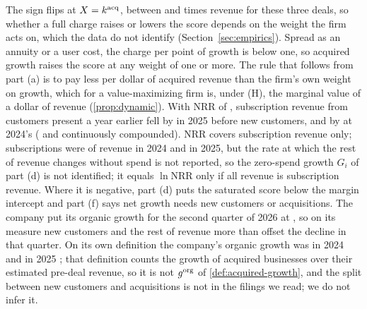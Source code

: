 The sign flips at $X=k^{\rm acq}$, between \acqKEb{} and \acqKVim{} times revenue for these three deals, so whether a full charge raises or lowers the score depends on the weight the firm acts on, which the data do not identify (Section~\ref{sec:empirics}). Spread as an annuity or a user cost, the charge per point of growth is below one, so acquired growth raises the score at any weight of one or more. The rule that follows from part (a) is to pay less per dollar of acquired revenue than the firm's own weight on growth, which for a value-maximizing firm is, under (H), the marginal value of a dollar of revenue (\autoref{prop:dynamic}).
With NRR of \acqNrrTwentyFive, subscription revenue from customers present a year earlier fell by \acqDeclLo{} in 2025 before new customers, and by \acqDeclHi{} at 2024's \acqNrrTwentyFour{} (\acqGiTwentyFive{} and \acqGiTwentyFour{} continuously compounded). NRR covers subscription revenue only; subscriptions were \acqSubsTwentyFour{} of revenue in 2024 and \acqSubsTwentyFive{} in 2025, but the rate at which the rest of revenue changes without spend is not reported, so the zero-spend growth $G_i$ of part (d) is not identified; it equals $\ln\mathrm{NRR}$ only if all revenue is subscription revenue. Where it is negative, part (d) puts the saturated score below the margin intercept and part (f) says net growth needs new customers or acquisitions. The company put its organic growth for the second quarter of 2026 at \acqQTwoOrg, so on its measure new customers and the rest of revenue more than offset the decline in that quarter. On its own definition the company's organic growth was \acqOrgGTwentyFour{} in 2024 and \acqOrgGTwentyFive{} in 2025 \citep{bendingspoons2026prospectus}; that definition counts the growth of acquired businesses over their estimated pre-deal revenue, so it is not $g^{\rm org}$ of \autoref{def:acquired-growth}, and the split between new customers and acquisitions is not in the filings we read; we do not infer it.

